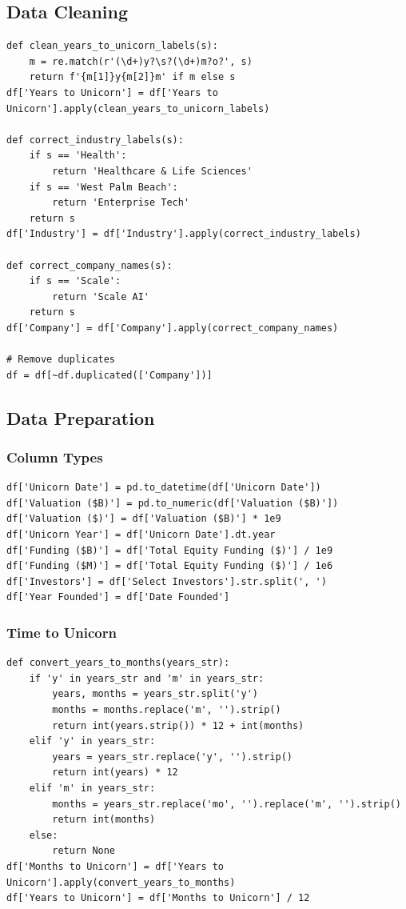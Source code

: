 \documentclass[a4paper,12pt]{article}
\begin{document}
\subsection{Data Cleaning}
\label{sec:orgfd12515}
\begin{verbatim}
def clean_years_to_unicorn_labels(s):
    m = re.match(r'(\d+)y?\s?(\d+)m?o?', s)
    return f'{m[1]}y{m[2]}m' if m else s
df['Years to Unicorn'] = df['Years to Unicorn'].apply(clean_years_to_unicorn_labels)

def correct_industry_labels(s):
    if s == 'Health':
        return 'Healthcare & Life Sciences'
    if s == 'West Palm Beach':
        return 'Enterprise Tech'
    return s
df['Industry'] = df['Industry'].apply(correct_industry_labels)

def correct_company_names(s):
    if s == 'Scale':
        return 'Scale AI'
    return s
df['Company'] = df['Company'].apply(correct_company_names)

# Remove duplicates
df = df[~df.duplicated(['Company'])]
\end{verbatim}
\subsection{Data Preparation}
\label{sec:org49ac92f}
\subsubsection{Column Types}
\label{sec:orge26c909}
\begin{verbatim}
df['Unicorn Date'] = pd.to_datetime(df['Unicorn Date'])
df['Valuation ($B)'] = pd.to_numeric(df['Valuation ($B)'])
df['Valuation ($)'] = df['Valuation ($B)'] * 1e9
df['Unicorn Year'] = df['Unicorn Date'].dt.year
df['Funding ($B)'] = df['Total Equity Funding ($)'] / 1e9
df['Funding ($M)'] = df['Total Equity Funding ($)'] / 1e6
df['Investors'] = df['Select Investors'].str.split(', ')
df['Year Founded'] = df['Date Founded']
\end{verbatim}
\subsubsection{Time to Unicorn}
\label{sec:org9236888}
\begin{verbatim}
def convert_years_to_months(years_str):
    if 'y' in years_str and 'm' in years_str:
        years, months = years_str.split('y')
        months = months.replace('m', '').strip()
        return int(years.strip()) * 12 + int(months)
    elif 'y' in years_str:
        years = years_str.replace('y', '').strip()
        return int(years) * 12
    elif 'm' in years_str:
        months = years_str.replace('mo', '').replace('m', '').strip()
        return int(months)
    else:
        return None
df['Months to Unicorn'] = df['Years to Unicorn'].apply(convert_years_to_months)
df['Years to Unicorn'] = df['Months to Unicorn'] / 12
\end{verbatim}
\end{document}
